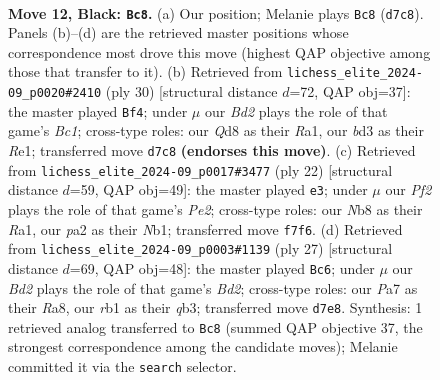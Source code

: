 \documentclass[11pt]{article}
\begin{document}
\clearpage

\begin{figure}[p]\centering
\begin{subfigure}{0.46\textwidth}\centering
\resizebox{\linewidth}{!}{%
\newchessgame
\chessboard[
  setfen={rn1q1rk1/pp1b1ppp/4p3/2P4n/2P5/3BPN2/P4PPP/1RBQ1RK1 b - - 2 12},
  showmover=false,
  pgfstyle=straightmove, color=movearrow, markmove={d7-c8}
]}
\caption{}
\end{subfigure}\hfill
\begin{subfigure}{0.46\textwidth}\centering
\resizebox{\linewidth}{!}{%
\newchessgame
\chessboard[
  setfen={r1bq1rk1/pp2bppp/2p2n2/8/2NP4/8/PP3PPP/R1BQRBK1 w - - 1 16},
  showmover=false,
  pgfstyle=straightmove, color=movearrow, markmove={c1-f4}
]}
\caption{}
\end{subfigure}
\\[4pt]
\begin{subfigure}{0.46\textwidth}\centering
\resizebox{\linewidth}{!}{%
\newchessgame
\chessboard[
  setfen={rnbq1rk1/pp2b1pp/2p1pp2/8/2NP1P2/8/PP2PPBP/RN1Q1RK1 w - - 0 12},
  showmover=false,
  pgfstyle=straightmove, color=movearrow, markmove={e2-e3}
]}
\caption{}
\end{subfigure}\hfill
\begin{subfigure}{0.46\textwidth}\centering
\resizebox{\linewidth}{!}{%
\newchessgame
\chessboard[
  setfen={rn3rk1/pp1bqpp1/4p2p/8/2B5/1Q2PN2/PP3PPP/2R2RK1 b - - 4 14},
  showmover=false,
  pgfstyle=straightmove, color=movearrow, markmove={d7-c6}
]}
\caption{}
\end{subfigure}
\caption{\textbf{Move 12, Black: \texttt{Bc8}.} (a) Our position; Melanie plays \texttt{Bc8} (\texttt{d7c8}). Panels (b)--(d) are the retrieved master positions whose correspondence most drove this move (highest QAP objective among those that transfer to it). (b) Retrieved from \texttt{lichess\_elite\_2024-09\_p0020\#2410} (ply 30) [structural distance $d$=72, QAP obj=37]: the master played \texttt{Bf4}; under $\mu$ our \emph{Bd2} plays the role of that game's \emph{Bc1}; cross-type roles: our \emph{Q}d8 as their \emph{R}a1, our \emph{b}d3 as their \emph{R}e1; transferred move \texttt{d7c8} \textbf{(endorses this move)}. (c) Retrieved from \texttt{lichess\_elite\_2024-09\_p0017\#3477} (ply 22) [structural distance $d$=59, QAP obj=49]: the master played \texttt{e3}; under $\mu$ our \emph{Pf2} plays the role of that game's \emph{Pe2}; cross-type roles: our \emph{N}b8 as their \emph{R}a1, our \emph{p}a2 as their \emph{N}b1; transferred move \texttt{f7f6}. (d) Retrieved from \texttt{lichess\_elite\_2024-09\_p0003\#1139} (ply 27) [structural distance $d$=69, QAP obj=48]: the master played \texttt{Bc6}; under $\mu$ our \emph{Bd2} plays the role of that game's \emph{Bd2}; cross-type roles: our \emph{P}a7 as their \emph{R}a8, our \emph{r}b1 as their \emph{q}b3; transferred move \texttt{d7e8}. Synthesis: 1 retrieved analog transferred to \texttt{Bc8} (summed QAP objective 37, the strongest correspondence among the candidate moves); Melanie committed it via the \texttt{search} selector.}
\label{fig:thought-m23}
\end{figure}
\end{document}
